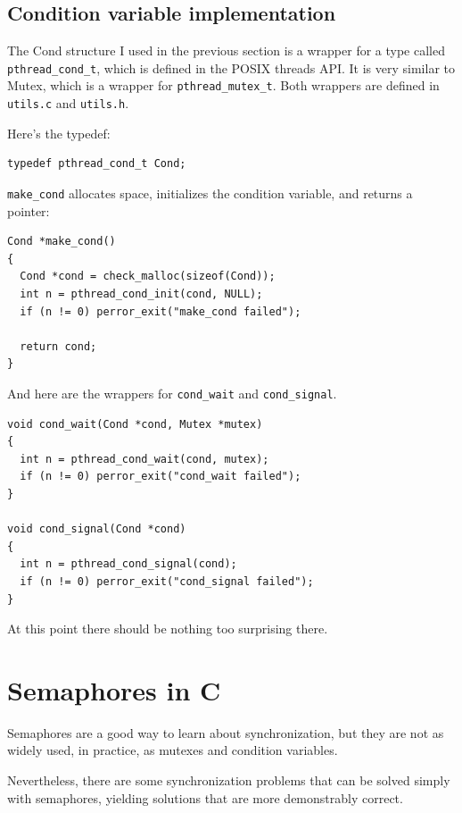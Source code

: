 \documentclass[12pt]{book}
\begin{document}
\section{Condition variable implementation}

The Cond structure I used in the previous section is a wrapper
for a type called \verb"pthread_cond_t", which is defined in the POSIX
threads API.  It is very similar to Mutex, which is a wrapper for
\verb"pthread_mutex_t".  Both wrappers are defined in {\tt utils.c} and
{\tt utils.h}.

Here's the typedef:

\begin{verbatim}
typedef pthread_cond_t Cond;
\end{verbatim}

\verb"make_cond" allocates space, initializes the condition variable,
and returns a pointer:

\begin{verbatim}
Cond *make_cond()
{
  Cond *cond = check_malloc(sizeof(Cond)); 
  int n = pthread_cond_init(cond, NULL);
  if (n != 0) perror_exit("make_cond failed");
 
  return cond;
}
\end{verbatim}

And here are the wrappers for \verb"cond_wait" and \verb"cond_signal".

\begin{verbatim}
void cond_wait(Cond *cond, Mutex *mutex)
{
  int n = pthread_cond_wait(cond, mutex);
  if (n != 0) perror_exit("cond_wait failed");
}

void cond_signal(Cond *cond)
{
  int n = pthread_cond_signal(cond);
  if (n != 0) perror_exit("cond_signal failed");
}
\end{verbatim}

At this point there should be nothing too surprising there.



\chapter{Semaphores in C}

Semaphores are a good way to learn about synchronization, but
they are not as widely used, in practice, as mutexes and
condition variables.

Nevertheless, there are some synchronization problems that can be
solved simply with semaphores, yielding solutions that are more
demonstrably correct.
\end{document}

